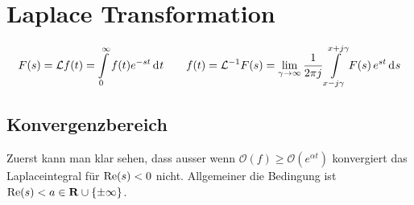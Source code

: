 \section{Laplace Transformation}
\[
  F(s) = \mathcal{L} f(t) = \int\limits_{0}^{\infty} f(t) e^{-st} \,\mathrm{d}^{} t
  \qquad
  f(t) = \mathcal{L}^{-1} F(s) = \lim_{\gamma\to\infty} \frac{1}{2\pi j} 
  	\int\limits_{x - j\gamma}^{x + j\gamma} F(s)\, e^{st} \,\mathrm{d}^{} s
\]
\subsection{Konvergenzbereich}
Zuerst kann man klar sehen, dass ausser wenn 
\(\mathcal{O}(f) \geq \mathcal{O}(e^{\alpha t})\)
konvergiert das Laplaceintegral f\"ur \(\operatorname{\mathrm{Re}}(s) < 0\) nicht.
Allgemeiner die Bedingung ist \(\operatorname{\mathrm{Re}}(s) < a \in \mathbf{R}\cup\{\pm\infty\}\).
